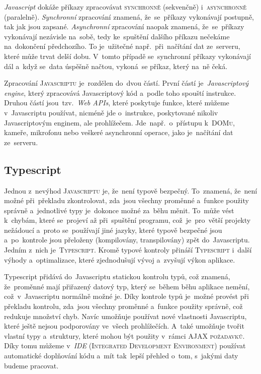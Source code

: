\documentclass[14pt,a4paper]{article}
\begin{document}
        \emph{Javascript} dokáže příkazy zpracovávat \textsc{synchronně} (sekvenčně) i~\textsc{asynchronně} (paralelně).
        \emph{Synchronní} zpracování znamená, že~se~příkazy vykonávají postupně, tak jak
        jsou zapsané.
        \emph{Asynchronní} zpracování naopak znamená, že~se~příkazy vykonávají nezávisle na~sobě, tedy ke~spuštění dalšího příkazu nečekáme na~dokončení předchozího. To je~užitečné např.~při~načítání dat ze~serveru,
        které může trvat delší dobu. V~tomto případě se~synchronní příkazy vykonávají dál a~když se~data úspěšně načtou, vykoná~se příkaz, který na~ně čeká. \cite{kantor_javascript}

        Zpracování \textsc{Javascriptu} je~rozdělen do~dvou částí. První částí je~\emph{Javascriptový engine}, který zpracovává Javascriptový kód a~podle toho spouští instrukce. Druhou částí jsou~tzv.~\emph{Web APIs}, které poskytuje funkce, které můžeme v~Javascriptu používat, nicméně jde o~instrukce, poskytované nikoliv Javascriptovým enginem, ale prohlížečem. Jde~např.~o~přístupu k~\textsc{DOMu}, kameře, mikrofonu nebo veškeré asynchronní operace, jako je~načítání dat ze~serveru. \cite{mdn:js}

        \subsection{Typescript}
        Jednou z~nevýhod \textsc{Javascriptu} je, že~není typově bezpečný. To~znamená, že~není možné při~překladu zkontrolovat, zda~jsou všechny proměnné a~funkce použity správně a~jednotlivé typy je~dokonce možné za~běhu měnit. To~může vést k~chybám, které se~projeví až při~spuštění programu, což~je~pro~větší projekty nežádoucí a~proto se~používají jiné jazyky, které typově bezpečné jsou a~po~kontrole jsou přeloženy (kompilovány, transpilovány) zpět do~Javascriptu. Jedním z~nich je~\textsc{Typescript}. Kromě typové kontroly přináší \textsc{Typescript} i~další výhody a~optimalizace, které zjednodušují vývoj a~zvyšují výkon aplikace.

        Typescript přidává do~Javascriptu statickou kontrolu typů, což znamená, že~proměnné mají přiřazený datový typ, který se~během běhu aplikace nemění, což~v~Javascriptu normálně možné je. Díky kontrole typů je~možné provést při překladu kontrolu, zda~jsou všechny proměnné a~funkce použity správně, což redukuje množství chyb. Navíc umožňuje používat nové vlastnosti Javascriptu, které ještě nejsou podporovány ve~všech prohlížečích. A~také umožňuje tvořit vlastní typy a~struktury, které mohou být použity v~rámci \textsc{AJAX požadavků}. Díky tomu můžeme v~\emph{IDE} (\textsc{Integrated Development Environment}) používat automatické doplňování kódu a~mít tak~lepší přehled o~tom, s~jakými daty budeme pracovat.
\end{document}
